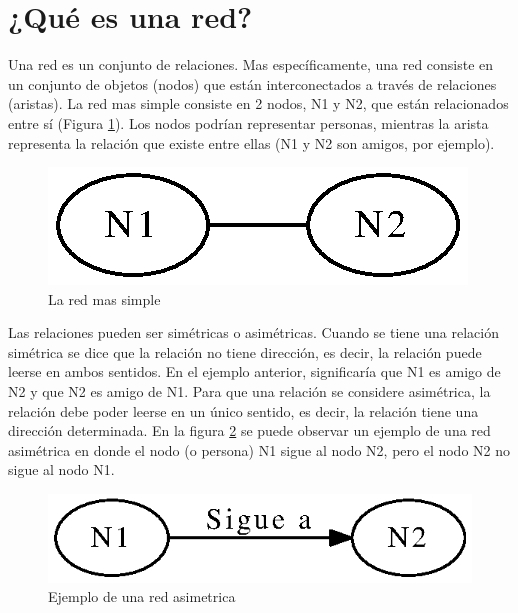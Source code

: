 \section{¿Qué es una red?}

Una red es un conjunto de relaciones. Mas específicamente, una red consiste en un conjunto de objetos (nodos) que están interconectados a través de relaciones (aristas). La red mas simple consiste en 2 nodos, N1 y N2, que están relacionados entre sí (Figura \ref{fig:simple}). Los nodos podrían representar personas, mientras la arista representa la relación que existe entre ellas (N1 y N2 son amigos, por ejemplo).

\begin{figure}[!htb]
  \begin{center}
    \includegraphics{./imagenes/Red_simple.eps}
    \caption{La red mas simple}
    \label{fig:simple}
  \end{center}
\end{figure}

Las relaciones pueden ser simétricas o asimétricas. Cuando se tiene una relación simétrica se dice que la relación no tiene dirección, es decir, la relación puede leerse en ambos sentidos. En el ejemplo anterior, significaría que N1 es amigo de N2 y que N2 es amigo de N1. Para que una relación se considere asimétrica, la relación debe poder leerse en un único sentido, es decir, la relación tiene una dirección determinada. En la figura \ref{fig:asimetrica} se puede observar un ejemplo de una red asimétrica en donde el nodo (o persona) N1 sigue al nodo N2, pero el nodo N2 no sigue al nodo N1.

\begin{figure}[!htb]
  \begin{center}
    \includegraphics{./imagenes/Red_asimetrica.eps}
    \caption{Ejemplo de una red asimetrica}
    \label{fig:asimetrica}
  \end{center}
\end{figure}


